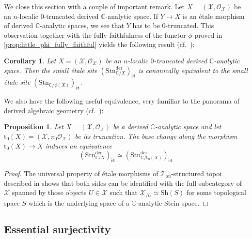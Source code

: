\documentclass[12pt,a4paper,reqno]{amsart}
\theoremstyle{plain}
\newtheorem{prop}[thm]{Proposition}
\newtheorem{cor}[thm]{Corollary}
\theoremstyle{definition}
\theoremstyle{remark}
\numberwithin{equation}{section}
\begin{document}
We close this section with a couple of important remark.
Let $X = ({\mathcal X}, {\mathcal O}_{\mathcal X})$ be an $n$-localic $0$-truncated derived {$\mathbb C$-analytic\xspace} space.
If $Y \to X$ is an \'etale morphism of derived {$\mathbb C$-analytic\xspace} spaces, we see that $Y$ has to be $0$-truncated.
This observation together with the fully faithfulness of the functor $\phi$ proved in \cref{prop:little_phi_fully_faithful} yields the following result (cf.\ \cite[Proposition 2.2.4.4.(4)]{HAG-II}):

\begin{cor} \label{cor:equivalence_of_small_etale_sites}
	Let $X = ({\mathcal X}, {\mathcal O}_{\mathcal X})$ be an $n$-localic $0$-truncated derived {$\mathbb C$-analytic\xspace} space.
	Then the small \'etale site $(\mathrm{Stn}^{\mathrm{der}}_{\mathbb C / X})_{\mathrm{\acute{e}t}}$ is canonically equivalent to the small \'etale site $(\mathrm{Stn}_{\mathbb C / \phi(X)})_{\mathrm{\acute{e}t}}$.
\end{cor}

We also have the following useful equivalence, very familiar to the panorama of derived algebraic geometry (cf.\ \cite[Corollary 2.2.2.9]{HAG-II}):

\begin{prop} \label{prop:equivalence_etale_sites_truncation}
	Let $X = ({\mathcal X}, {\mathcal O}_{\mathcal X})$ be a derived {$\mathbb C$-analytic\xspace} space and let ${\mathrm{t}_0}(X) = ({\mathcal X}, \pi_0 {\mathcal O}_{\mathcal X})$ be its truncation.
	The base change along the morphism ${\mathrm{t}_0}(X) \to X$ induces an equivalence
	\[ (\mathrm{Stn}^{\mathrm{der}}_{\mathbb C / X})_{\mathrm{\acute{e}t}} \simeq (\mathrm{Stn}^{\mathrm{der}}_{\mathbb C / {\mathrm{t}_0}(X)})_{\mathrm{\acute{e}t}} \]
\end{prop}

\begin{proof}
	The universal property of \'etale morphisms of ${{\mathcal T}_{\mathrm{an}}}$-structured topoi described in \cite[Example 2.3.4]{DAG-V} shows that both sides can be identified with the full subcategory of ${\mathcal X}$ spanned by those objects $U \in {\mathcal X}$ such that ${\mathcal X}_{/U} \simeq {\mathrm{Sh}}(S)$ for some topological space $S$ which is the underlying space of a {$\mathbb C$-analytic\xspace} Stein space.
\end{proof}

\subsection{Essential surjectivity} \label{subsec:essential_surjectivity}
\end{document}
